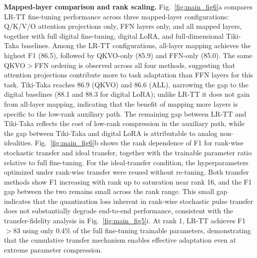 \documentclass[fleqn,10pt]{wlscirep}
\begin{document}
\noindent
\textbf{Mapped-layer comparison and rank scaling.}
Fig.~\ref{fig:main_fig6}a compares LR-TT fine-tuning performance across three mapped-layer configurations: Q/K/V/O attention projections only, FFN layers only, and all mapped layers, together with full digital fine-tuning, digital LoRA, and full-dimensional Tiki-Taka baselines. Among the LR-TT configurations, all-layer mapping achieves the highest F1 (86.5), followed by QKVO-only (85.9) and FFN-only (85.0). The same QKVO\(>\)FFN ordering is observed across all four methods, suggesting that attention projections contribute more to task adaptation than FFN layers for this task. Tiki-Taka reaches 86.9 (QKVO) and 86.6 (ALL), narrowing the gap to the digital baselines (88.1 and 88.3 for digital LoRA); unlike LR-TT it does not gain from all-layer mapping, indicating that the benefit of mapping more layers is specific to the low-rank auxiliary path. The remaining gap between LR-TT and Tiki-Taka reflects the cost of low-rank compression in the auxiliary path, while the gap between Tiki-Taka and digital LoRA is attributable to analog non-idealities. Fig.~\ref{fig:main_fig6}b shows the rank dependence of F1 for rank-wise stochastic transfer and ideal transfer, together with the trainable parameter ratio relative to full fine-tuning. For the ideal-transfer condition, the hyperparameters optimized under rank-wise transfer were reused without re-tuning. Both transfer methods show F1 increasing with rank up to saturation near rank 16, and the F1 gap between the two remains small across the rank range. This small gap indicates that the quantization loss inherent in rank-wise stochastic pulse transfer does not substantially degrade end-to-end performance, consistent with the transfer-fidelity analysis in Fig.~\ref{fig:main_fig5}i. At rank 1, LR-TT achieves F1\(>\)83 using only 0.4\% of the full fine-tuning trainable parameters, demonstrating that the cumulative transfer mechanism enables effective adaptation even at extreme parameter compression.
\end{document}
